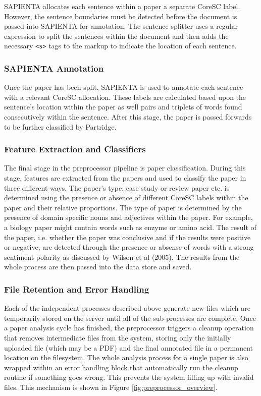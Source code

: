 SAPIENTA allocates each sentence within a paper a separate CoreSC label.
However, the sentence boundaries must be detected before the document is passed
into SAPIENTA for annotation. The sentence splitter uses a regular expression
to split the sentences within the document and then adds the necessary
\verb|<s>| tags to the markup to indicate the location of each sentence.

\subsubsection{SAPIENTA Annotation}

Once the paper has been split, SAPIENTA is used to annotate each sentence with
a relevant CoreSC allocation. These labels are calculated based upon the
sentence's location within the paper as well pairs and triplets of words found
consecutively within the sentence. After this stage, the paper is passed
forwards to be further classified by Partridge.


\subsubsection{Feature Extraction and Classifiers}

The final stage in the preprocessor pipeline is paper classification. During
this stage, features are extracted from the papers and used to classify the
paper in three different ways. The paper's type: case study or review paper
etc. is determined using the presence or absence of different CoreSC labels
within the paper and their relative proportions. The type of paper is
determined by the presence of domain specific nouns and adjectives within the
paper. For example, a biology paper might contain words such as enzyme or amino
acid. The result of the paper, i.e. whether the paper was conclusive and if the
results were positive or negative, are detected through the presence or absense
of words with a strong sentiment polarity as discussed by Wilson et al
(2005)\cite{Wilson05Polarity}. The results from the whole process are then
passed into the data store and saved.

\subsubsection{File Retention and Error Handling}

Each of the independent processes described above generate new files which are
temporarily stored on the server until all of the sub-processes are complete.
Once a paper analysis cycle has finished, the preprocessor triggers a cleanup
operation that removes intermediate files from the system, storing only the
initially uploaded file (which may be a PDF) and the final annotated file in a
permanent location on the filesystem.  The whole analysis process for a single
paper is also wrapped within an error handling block that automatically run the
cleanup routine if something goes wrong. This prevents the system filling up
with invalid files. This mechanism is shown in Figure
\ref{fig:preprocessor_overview}.

